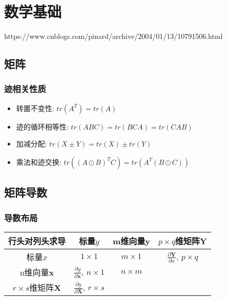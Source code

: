 \documentclass[UTF8]{article}
\newcommand{\partialx}[2]{\frac{\partial #1}{\partial #2}}
\begin{document}
\section{数学基础}
https://www.cnblogs.com/pinard/archive/2004/01/13/10791506.html
\subsection{矩阵}
\subsubsection{迹相关性质}
\begin{itemize}
\item 转置不变性: $tr(A^T)=tr(A)$
\item 迹的循环相等性: $tr(ABC)=tr(BCA)=tr(CAB)$
\item 加减分配: $tr(X\pm Y)=tr(X)\pm tr(Y)$
\item 乘法和迹交换: $tr((A\odot B)^TC)=tr(A^T(B\odot C))$
\end{itemize}

\subsection{矩阵导数}
\subsubsection{导数布局}
\begin{tabular}{|c|c|c|c|}
\hline
行头对列头求导 & 标量$y$ & m维向量$\bm{y}$ & $p\times q$维矩阵$\bm{Y}$ \\
\hline
标量$x$ & $1\times1$ & $m\times 1$ & $\partialx{\bm{Y}}{x}$, $p\times q$ \\
\hline
n维向量$\bm{x}$ & $\partialx{y}{\bm{x}}$, $n\times 1$ & $n\times m$ &  \\
\hline
$r\times s$维矩阵$\bm{X}$ & $\partialx{y}{\bm{X}}$, $r\times s$ &  &  \\
\hline
\end{tabular}
\end{document}
